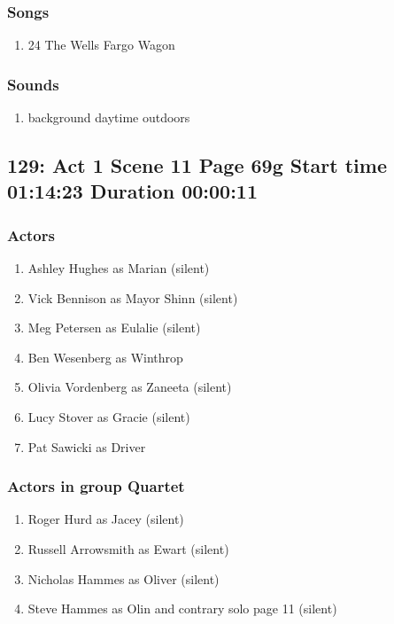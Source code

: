 \subsubsection{Songs}
\begin{enumerate}
\item 24 The Wells Fargo Wagon
\end{enumerate}\subsubsection{Sounds}
\begin{enumerate}
\item background daytime outdoors
\end{enumerate}
\subsection{129: Act 1 Scene 11 Page 69g Start time 01:14:23 Duration 00:00:11}

\subsubsection{Actors}
\begin{enumerate}
\item Ashley Hughes as Marian (silent)
\item Vick Bennison as Mayor Shinn (silent)
\item Meg Petersen as Eulalie (silent)
\item Ben Wesenberg as Winthrop
\item Olivia Vordenberg as Zaneeta (silent)
\item Lucy Stover as Gracie (silent)
\item Pat Sawicki as Driver
\end{enumerate}
\subsubsection{Actors in group Quartet}
\begin{enumerate}
\item Roger Hurd as Jacey (silent)
\item Russell Arrowsmith as Ewart (silent)
\item Nicholas Hammes as Oliver (silent)
\item Steve Hammes as Olin and contrary solo page 11 (silent)
\end{enumerate}
